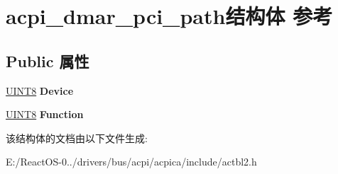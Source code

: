 \hypertarget{structacpi__dmar__pci__path}{}\section{acpi\+\_\+dmar\+\_\+pci\+\_\+path结构体 参考}
\label{structacpi__dmar__pci__path}
\subsection*{Public 属性}
\begin{DoxyCompactItemize}
\item 
\mbox{\label{structacpi__dmar__pci__path_a29a2bf88a7b460c1f054b0bb0bd185ac}} 
\hyperlink{_processor_bind_8h_ab27e9918b538ce9d8ca692479b375b6a}{U\+I\+N\+T8} {\bfseries Device}
\item 
\mbox{\label{structacpi__dmar__pci__path_a2e63e4e1b4e5723671efd0989a80898d}} 
\hyperlink{_processor_bind_8h_ab27e9918b538ce9d8ca692479b375b6a}{U\+I\+N\+T8} {\bfseries Function}
\end{DoxyCompactItemize}


该结构体的文档由以下文件生成\+:\begin{DoxyCompactItemize}
\item 
E\+:/\+React\+O\+S-\/0../drivers/bus/acpi/acpica/include/actbl2.\+h\end{DoxyCompactItemize}
